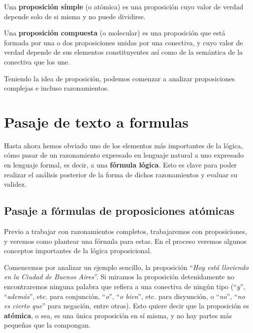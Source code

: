\begin{definition}
    Una \textbf{proposición símple} (o atómica) es una
    proposición cuyo valor de verdad depende solo de si misma y no puede
    dividirse.
\end{definition}

\begin{definition}
    Una \textbf{proposición compuesta} (o molecular)
    es una proposición que está formada por una o dos proposiciones unidas por
    una conectiva, y cuyo valor de verdad depende de sus elementos
    constituyentes así como de la semántica de la conectiva que los une.
\end{definition}

Teniendo la idea de proposición, podemos comenzar a analizar proposiciones
complejas e incluso razonamientos.

\section{Pasaje de texto a formulas}
\label{chap:logica_proposicional:sec:pasaje_a_formulas}

Hasta ahora hemos obviado uno de los elementos más importantes de la lógica,
cómo pasar de un razonamiento expresado en lenguaje natural a uno expresado en
lenguaje formal, es decir, a una \textbf{fórmula lógica}. Esto es clave para poder realizar el análisis posterior
de la forma de dichos razonamientos y evaluar su validez.

\subsection{Pasaje a fórmulas de proposiciones atómicas}
\label{chap:logica_proposicional:subsec:pasaje_proposiciones_atomicas}

Previo a trabajar con razonamientos completos, trabajaremos con proposiciones, y
veremos como plantear una fórmula para estas. En el proceso veremos algunos
conceptos importantes de la lógica proposicional.

Comencemos por analizar un ejemplo sencillo, la proposición ``\textit{Hoy está
lloviendo en la Ciudad de Buenos Aires}''. Si miramos la proposición
detenidamente no encontraremos ninguna palabra que refiera a una conectiva de
ningún tipo (``\textit{y}'', ``\textit{además}'', etc. para conjunción,
``\textit{o}'', ``\textit{o bien}'', etc. para disyunción, o  ``\textit{no}'',
``\textit{no es cierto que}'' para negación, entre otras). Esto quiere decir que
la proposición es \textbf{atómica}, o sea, es una única proposición en sí misma,
y no hay partes más pequeñas que la compongan.

